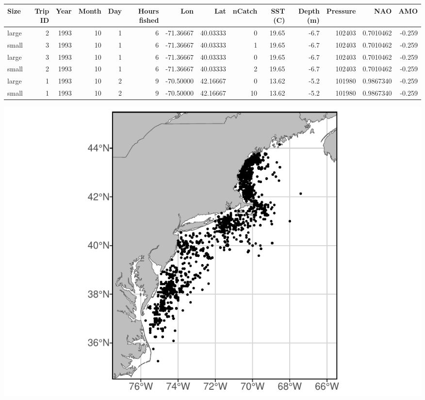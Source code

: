 \documentclass[
]{article}
\let\origfigure\figure
\let\endorigfigure\endfigure
\renewenvironment{figure}[1][2] {
    \expandafter\origfigure\expandafter[H]
} {
    \endorigfigure
}
\let\origtable\table
\let\endorigtable\endtable
\renewenvironment{table}[1][2] {
    \expandafter\origtable\expandafter[H]
} {
    \endorigtable
}
\begin{document}
\begin{landscape}\begin{table}[H]

\caption{\label{tab:mergelps}American Large Pelagic Survey example}
\centering
\begin{tabular}[t]{lrrrrrrrrrrrrr}
\toprule
Size & Trip
ID & Year & Month & Day & Hours
fished & Lon & Lat & nCatch & SST
(C) & Depth
(m) & Pressure & NAO & AMO\\
\midrule
large & 2 & 1993 & 10 & 1 & 6 & -71.36667 & 40.03333 & 0 & 19.65 & -6.7 & 102403 & 0.7010462 & -0.259\\
small & 3 & 1993 & 10 & 1 & 6 & -71.36667 & 40.03333 & 1 & 19.65 & -6.7 & 102403 & 0.7010462 & -0.259\\
large & 3 & 1993 & 10 & 1 & 6 & -71.36667 & 40.03333 & 0 & 19.65 & -6.7 & 102403 & 0.7010462 & -0.259\\
small & 2 & 1993 & 10 & 1 & 6 & -71.36667 & 40.03333 & 2 & 19.65 & -6.7 & 102403 & 0.7010462 & -0.259\\
large & 1 & 1993 & 10 & 2 & 9 & -70.50000 & 42.16667 & 0 & 13.62 & -5.2 & 101980 & 0.9867340 & -0.259\\
\addlinespace
small & 1 & 1993 & 10 & 2 & 9 & -70.50000 & 42.16667 & 10 & 13.62 & -5.2 & 101980 & 0.9867340 & -0.259\\
\bottomrule
\end{tabular}
\end{table}
\end{landscape}

\begin{figure}
\centering
\includegraphics{Model_Prelim_Report_files/figure-latex/americanplot-1.pdf}
\caption{\label{fig:americanplot}Fig. 2: Spatial distribution of American recreational catch}
\end{figure}
\end{document}
